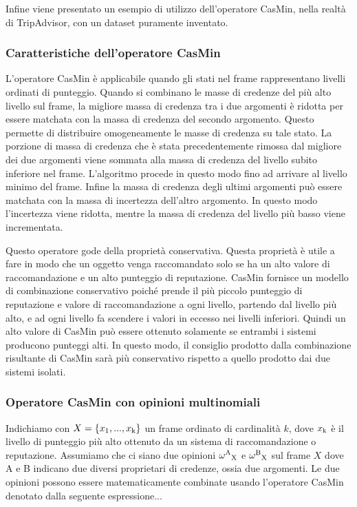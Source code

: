 \documentclass{report}
\begin{document}
	Infine viene presentato un esempio di utilizzo dell'operatore CasMin,
	nella realtà di TripAdvisor, con un dataset puramente inventato.
	
	\hypertarget{header-n146}{%
		\subsubsection{Caratteristiche dell'operatore
			CasMin}\label{header-n146}}
	
	L'operatore CasMin è applicabile quando gli stati nel frame
	rappresentano livelli ordinati di punteggio. Quando si combinano le
	masse di credenze del più alto livello sul frame, la migliore massa di
	credenza tra i due argomenti è ridotta per essere matchata con la massa
	di credenza del secondo argomento. Questo permette di distribuire
	omogeneamente le masse di credenza su tale stato. La porzione di massa
	di credenza che è stata precedentemente rimossa dal migliore dei due
	argomenti viene sommata alla massa di credenza del livello subito
	inferiore nel frame. L'algoritmo procede in questo modo fino ad arrivare
	al livello minimo del frame. Infine la massa di credenza degli ultimi
	argomenti può essere matchata con la massa di incertezza dell'altro
	argomento. In questo modo l'incertezza viene ridotta, mentre la massa di
	credenza del livello più basso viene incrementata.
	
	Questo operatore gode della proprietà conservativa. Questa proprietà è
	utile a fare in modo che un oggetto venga raccomandato solo se ha un
	alto valore di raccomandazione e un alto punteggio di reputazione.
	CasMin fornisce un modello di combinazione conservativo poiché prende il
	più piccolo punteggio di reputazione e valore di raccomandazione a ogni
	livello, partendo dal livello più alto, e ad ogni livello fa scendere i
	valori in eccesso nei livelli inferiori. Quindi un alto valore di CasMin
	può essere ottenuto solamente se entrambi i sistemi producono punteggi
	alti. In questo modo, il consiglio prodotto dalla combinazione
	risultante di CasMin sarà più conservativo rispetto a quello prodotto
	dai due sistemi isolati.
	
	\hypertarget{header-n151}{%
		\subsubsection{Operatore CasMin con opinioni
			multinomiali}\label{header-n151}}
	
	Indichiamo con $X=\{x\textsubscript{1} ,...,x\textsubscript{k}\}$ un frame
	ordinato di cardinalità $k$, dove $x\textsubscript{k}$ è il livello di punteggio più alto
	ottenuto da un sistema di raccomandazione o reputazione. Assumiamo che
	ci siano due opinioni $\omega\textsuperscript{A}\textsubscript{X}$ e $\omega\textsuperscript{B}\textsubscript{X}$ sul frame $X$ dove A e B indicano
	due diversi proprietari di credenze, ossia due argomenti. Le due
	opinioni possono essere matematicamente combinate usando l'operatore
	CasMin denotato dalla seguente espressione...
	
\end{document}
